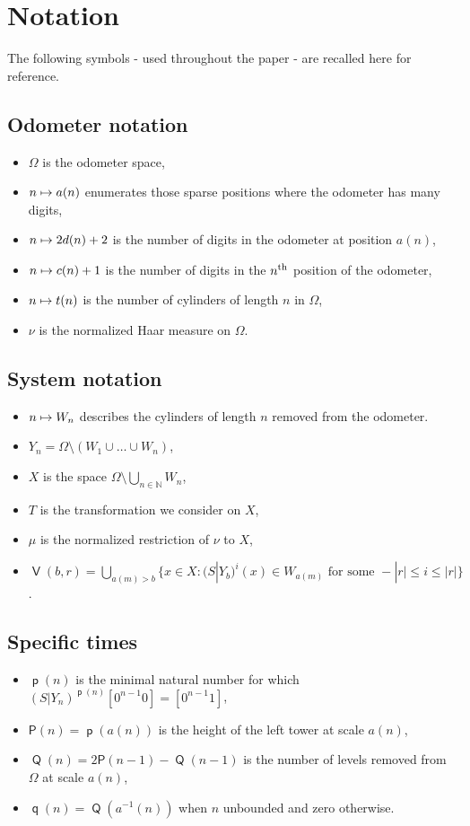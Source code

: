\documentclass[AHL,Unicode,longabstracts,published]{cedram}
\DeclareMathOperator{\bad}{\mathsf{V}}
\DeclareMathOperator{\p}{\mathsf{p}}
\DeclareMathOperator{\q}{\mathsf{q}}
\DeclareMathOperator{\Q}{\mathsf{Q}}
\newcommand{\N}{\mathbb{N}}
\renewcommand{\P}{\mathsf{P}}
\let\oldmapsto\mapsto
\renewcommand*{\mapsto}{\mathchoice{\longmapsto}{\oldmapsto}{\oldmapsto}{\oldmapsto}}
\begin{document}
\section{Notation}

The following symbols - used throughout the paper - are recalled here for reference.

\subsection*{Odometer notation}
\begin{itemize}
\item $\Omega$ is the odometer space,
\item $n \mapsto a(n)$ enumerates those sparse positions where the odometer has many digits,
\item $n \mapsto 2d(n)+2$ is the number of digits in the odometer at position $a(n)$,
\item $n \mapsto c(n) + 1$ is the number of digits in the $n^{\rm th}$ position of the odometer,
\item $n \mapsto t(n)$ is the number of cylinders of length $n$ in $\Omega$,
\item $\nu$ is the normalized Haar measure on $\Omega$.
\end{itemize}

\subsection*{System notation}
\begin{itemize}
\item $n \mapsto W_n$ describes the cylinders of length $n$ removed from the odometer.
\item $Y_n = \Omega \setminus (W_1 \cup \dots \cup W_n)$,
\item $X$ is the space $\Omega \setminus \bigcup_{n \in \N} W_n$,
\item $T$ is the transformation we consider on $X$,
\item $\mu$ is the normalized restriction of $\nu$ to $X$,
\item $\bad(b,r) = \bigcup_{a(m) > b} \{x \in X : (S|Y_b)^i(x) \in W_{a(m)} \text{ for some } -|r| \le i \le |r|\}$.
\end{itemize}


\subsection*{Specific times}
\begin{itemize}
\item $\p(n)$ is the minimal natural number for which $(S|Y_n)^{\p(n)}[0^{n-1} 0] = [0^{n-1} 1]$,
\item $\P(n) = \p(a(n))$ is the height of the left tower at scale $a(n)$,
\item $\Q(n) = 2\P(n-1) - \Q(n-1)$ is the number of levels removed from $\Omega$ at scale $a(n)$,
\item $\q(n) = \Q(a^{-1}(n))$ when $n$ unbounded and zero otherwise.
\end{itemize}
\end{document}
